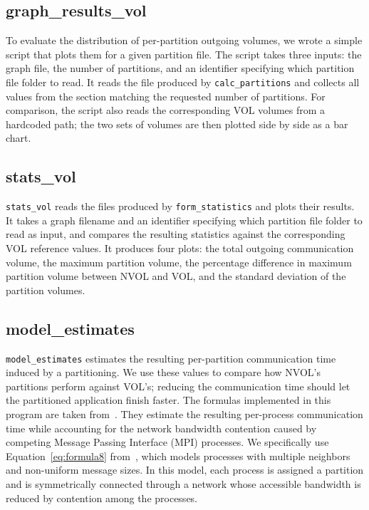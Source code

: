 \subsection{graph\_results\_vol}
To evaluate the distribution of per-partition outgoing volumes, we wrote a simple script that plots them for a given partition file. The script takes three inputs: the graph file, the number of partitions, and an identifier specifying which partition file folder to read. It reads the file produced by \texttt{calc\_partitions} and collects all values from the section matching the requested number of partitions. For comparison, the script also reads the corresponding VOL volumes from a hardcoded path; the two sets of volumes are then plotted side by side as a bar chart.

\subsection{stats\_vol}
\texttt{stats\_vol} reads the files produced by \texttt{form\_statistics} and plots their results. It takes a graph filename and an identifier specifying which partition file folder to read as input, and compares the resulting statistics against the corresponding VOL reference values. It produces four plots: the total outgoing communication volume, the maximum partition volume, the percentage difference in maximum partition volume between NVOL and VOL, and the standard deviation of the partition volumes.

\subsection{model\_estimates} \label{sec:model estimates}
\texttt{model\_estimates} estimates the resulting per-partition communication time induced by a partitioning. We use these values to compare how NVOL's partitions perform against VOL's; reducing the communication time should let the partitioned application finish faster. The formulas implemented in this program are taken from~\cite{Xing_of_Heterogeneous}. They estimate the resulting per-process communication time while accounting for the network bandwidth contention caused by competing Message Passing Interface (MPI) processes. We specifically use Equation~\ref{eq:formula8} from~\cite{Xing_of_Heterogeneous}, which models processes with multiple neighbors and non-uniform message sizes. In this model, each process is assigned a partition and is symmetrically connected through a network whose accessible bandwidth is reduced by contention among the processes.

